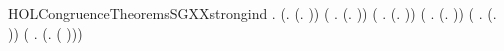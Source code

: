 \newcommand{\HOLCongruenceTheoremsSGXXSEQXXstrongXXinduction}{\UseVerbatim{HOLCongruenceTheoremsSGXXSEQXXstrongXXinduction}}
\begin{SaveVerbatim}{HOLCongruenceTheoremsSGXXstrongind}
\HOLTokenTurnstile{} \HOLSymConst{\HOLTokenForall{}}.
       (\HOLSymConst{\HOLTokenForall{}}.  (\HOLTokenLambda{}. )) \HOLSymConst{\HOLTokenConj{}}
       (\HOLSymConst{\HOLTokenForall{}} .   \HOLSymConst{\HOLTokenImp{}}  (\HOLTokenLambda{}.   )) \HOLSymConst{\HOLTokenConj{}}
       (\HOLSymConst{\HOLTokenForall{}} .   \HOLSymConst{\HOLTokenConj{}}   \HOLSymConst{\HOLTokenImp{}}  (\HOLTokenLambda{}.  )) \HOLSymConst{\HOLTokenConj{}}
       (\HOLSymConst{\HOLTokenForall{}} .
              \HOLSymConst{\HOLTokenConj{}}   \HOLSymConst{\HOLTokenConj{}}   \HOLSymConst{\HOLTokenConj{}}   \HOLSymConst{\HOLTokenImp{}}
             (\HOLTokenLambda{}.   \HOLSymConst{+}  )) \HOLSymConst{\HOLTokenConj{}}
       (\HOLSymConst{\HOLTokenForall{}} .
              \HOLSymConst{\HOLTokenConj{}}   \HOLSymConst{\HOLTokenConj{}}   \HOLSymConst{\HOLTokenConj{}}   \HOLSymConst{\HOLTokenImp{}}
             (\HOLTokenLambda{}.   \HOLSymConst{\ensuremath{\parallel}}  )) \HOLSymConst{\HOLTokenConj{}}
       (\HOLSymConst{\HOLTokenForall{}} .   \HOLSymConst{\HOLTokenConj{}}   \HOLSymConst{\HOLTokenImp{}}  (\HOLTokenLambda{}. \HOLConst{\ensuremath{\nu}}  ( ))) \HOLSymConst{\HOLTokenConj{}}

\end{SaveVerbatim}
